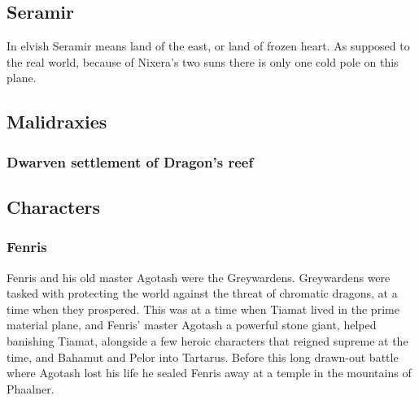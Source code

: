 \documentclass[a4paper]{article}
\begin{document}
\subsection{Seramir}
In elvish Seramir means land of the east, or land of frozen heart. As supposed to the real world, because of Nixera's two suns there is only one cold pole on this plane.

\subsection{Malidraxies}

\subsubsection{Dwarven settlement of Dragon's reef}


\subsection{Characters}

\subsubsection{Fenris}
Fenris and his old master Agotash were the Greywardens. Greywardens were tasked with protecting the world against the threat of chromatic dragons, at a time when they prospered. This was at a time when Tiamat lived in the prime material plane, and Fenris' master Agotash a powerful stone giant, helped banishing Tiamat, alongside a few heroic characters that reigned supreme at the time, and Bahamut and Pelor into Tartarus. Before this long drawn-out battle where Agotash lost his life he sealed Fenris away at a temple in the mountains of Phaalner.
\end{document}
